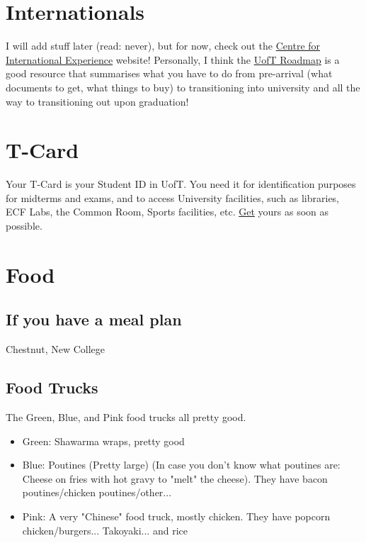 \section{Internationals}

I will add stuff later (read: never), but for now, check out the \href{https://internationalexperience.utoronto.ca/}{Centre for International Experience} website! Personally, I think the \href{https://internationalexperience.utoronto.ca/international-student-services/resource-and-information-hub/ise-roadmap/}{UofT Roadmap} is a good resource that summarises what you have to do from pre-arrival (what documents to get, what things to buy) to transitioning into university and all the way to transitioning out upon graduation!

\section{T-Card}

Your T-Card is your Student ID in UofT. You need it for identification purposes for midterms and exams, and to access University facilities, such as libraries, ECF Labs, the Common Room, Sports facilities, etc. \href{https://tcard.utoronto.ca/get-your-utorid-tcard/}{Get} yours as soon as possible.

\section{Food}

\subsection{If you have a meal plan}

Chestnut, New College

\subsection{Food Trucks}

The Green, Blue, and Pink food trucks all pretty good. 

\begin{itemize}
    \item Green: Shawarma wraps, pretty good
    \item Blue: Poutines (Pretty large) (In case you don't know what poutines are: Cheese on fries with hot gravy to "melt" the cheese). They have bacon poutines/chicken poutines/other...
    \item Pink: A very "Chinese" food truck, mostly chicken. They have popcorn chicken/burgers... Takoyaki... and rice
\end{itemize}

